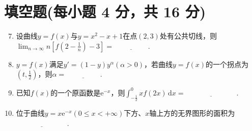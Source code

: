 \documentclass[../Main.tex]{subfiles}
\begin{document}
\section{填空题(每小题 4 分，共 16 分)}
\begin{enumerate}
    \setcounter{enumi}{6}
    \item 设曲线$y=f(x)$与$y=x^{2}-x+1$在点$(2,3)$处有公共切线，则$\lim_{n\to\infty}
              n\left[f\left(2-\frac{1}{n}\right)-3\right]=\underline{\hspace{2cm}}$.
          \vspace{0.5em}

    \item $y=f(x)$满足$y'=(1-y)y^{\alpha}(\alpha>0)$，若曲线$y=f(x)$的一个拐点为$\left
              (t,\frac{1}{2}\right)$，则$\alpha=\underline{\hspace{2cm}}$.
          \vspace{0.5em}

    \item 已知$f(x)$的一个原函数是$\mathrm{e}^{-x}$，则$\int_{-\frac{1}{2}}^{0}
              xf(2x)\,\mathrm{d}x=\underline{\hspace{3cm}}$.
          \vspace{0.5em}

    \item 位于曲线$y=x\mathrm{e}^{-x}(0\leq x<+\infty)$下方、$x$轴上方的无界图形的面积为$\underline
              {\hspace{3cm}}$.
          \vspace{0.5em}
\end{enumerate}
\end{document}
